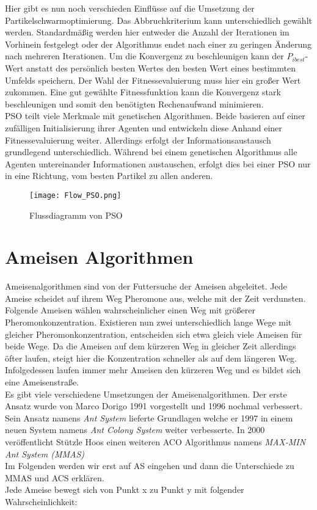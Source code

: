 Hier gibt es nun noch verschieden Einflüsse auf die Umsetzung der Partikelschwarmoptimierung.
Das Abbruchkriterium kann unterschiedlich gewählt werden. Standardmäßig werden hier entweder die Anzahl der Iterationen im Vorhinein festgelegt oder der Algorithmus endet nach einer zu geringen Änderung nach mehreren Iterationen. 
Um die Konvergenz zu beschleunigen kann der $P_{ibest}$-Wert anstatt des persönlich besten Wertes den besten Wert eines bestimmten Umfelds speichern.
Der Wahl der Fitnessevaluierung muss hier ein großer Wert zukommen. Eine gut gewählte Fitnessfunktion kann die Konvergenz stark beschleunigen und somit den benötigten Rechenaufwand minimieren.\\
PSO teilt viele Merkmale mit genetischen Algorithmen. Beide basieren auf einer zufälligen Initialisierung ihrer Agenten und entwickeln diese Anhand einer Fitnessevaluierung weiter. Allerdings erfolgt der Informationsaustausch grundlegend unterschiedlich. Während bei einem genetischen Algorithmus alle Agenten untereinander Informationen austauschen, erfolgt dies bei einer PSO nur in eine Richtung, vom besten Partikel zu allen anderen.\\


\begin{figure}
  \centering
  \texttt{[image: Flow\_PSO.png]}
  \caption{Flussdiagramm von PSO}
  \label{fig:Figure_PSO}
\end{figure}


\section{Ameisen Algorithmen}
Ameisenalgorithmen sind von der Futtersuche der Ameisen abgeleitet. Jede Ameise scheidet auf ihrem Weg Pheromone aus, welche mit der Zeit verdunsten. 
Folgende Ameisen wählen wahrscheinlicher einen Weg mit größerer Pheromonkonzentration. 
Existieren nun zwei unterschiedlich lange Wege mit gleicher Pheromonkonzentration, entscheiden sich etwa gleich viele Ameisen für beide Wege. 
Da die Ameisen auf dem kürzeren Weg in gleicher Zeit allerdings öfter laufen, steigt hier die Konzentration schneller als auf dem längeren Weg. 
Infolgedessen laufen immer mehr Ameisen den kürzeren Weg und es bildet sich eine Ameisenstraße.\\

Es gibt viele verschiedene Umsetzungen der Ameisenalgorithmen. Der erste Ansatz wurde von Marco Dorigo 1991 vorgestellt\cite{Dorigo1991AntSA} und 1996 nochmal verbessert\cite{484436}.
Sein Ansatz namens \emph{Ant System} lieferte Grundlagen welche er 1997 in einem neuen System namens \emph{Ant Colony System} weiter verbesserte\cite{585892}. In 2000 veröffentlicht Stützle Hoos einen weiteren ACO Algorithmus namens \emph{MAX-MIN Ant System (MMAS)} \cite{STUTZLE2000889} \\
Im Folgenden werden wir erst auf AS eingehen und dann die Unterschiede zu MMAS und ACS erklären.\\
Jede Ameise bewegt sich von Punkt x zu Punkt y mit folgender Wahrscheinlichkeit:\\


